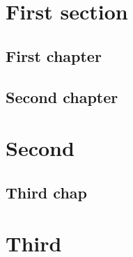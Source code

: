 \documentclass[a4paper, notitlepage]{report}
\author{Brian McNestry}
\date{\today}
\title{}
\begin{document}
\inserttitlepage


\declaration

\permissiontolend

\insertabstract

\acknowledgements

\tableofcontents

\newpage



\part{First section}
\label{sec:orgd830398}

\chapter{First chapter}
\label{sec:org5d20574}

\chapter{Second chapter}
\label{sec:org1187c47}
\part{Second}
\label{sec:org3bea903}
\chapter{Third chap}
\label{sec:orgbaae922}

\part{Third}
\label{sec:org11a1a4f}



\appendix
\end{document}
